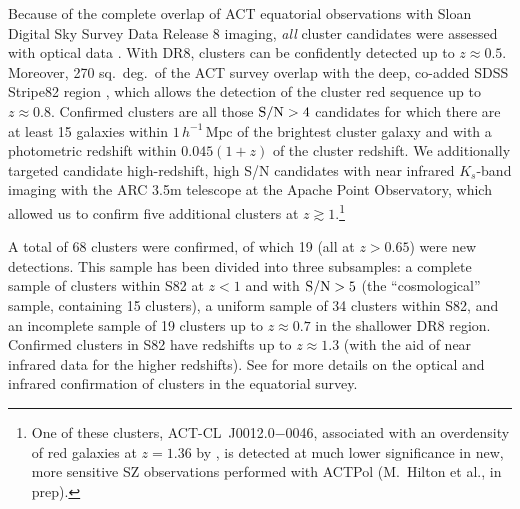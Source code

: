 Because of the complete overlap of ACT equatorial observations with Sloan Digital Sky Survey Data Release 8 \citep[SDSS DR8,][]{sdss8} imaging, {\em all} cluster candidates were assessed with optical data \citep{menanteau13}. With DR8, clusters can be confidently detected up to $z\approx0.5$. Moreover, 270 sq.\ deg.\ of the ACT survey overlap with the deep, co-added SDSS Stripe82 region \citep[S82,][]{annis14}, which allows the detection of the cluster red sequence up to $z\approx0.8$. Confirmed clusters are all those ${\rm S/N}>4$ candidates for which there are at least 15 galaxies within $1\,h^{-1}\,\mathrm{Mpc}$ of the brightest cluster galaxy and with a photometric redshift within $0.045(1+z)$ of the cluster redshift. We additionally targeted candidate high-redshift, high S/N candidates with near infrared $K_s$-band imaging with the ARC 3.5m telescope at the Apache Point Observatory, which allowed us to confirm five additional clusters at $z\gtrsim1$.\footnote{One of these clusters, ACT-CL~J0012.0$-$0046, associated with an overdensity of red galaxies at $z=1.36$ by \cite{menanteau13}, is detected at much lower significance in new, more sensitive SZ observations performed with ACTPol (M.\ Hilton et al., in prep).}

A total of 68 clusters were confirmed, of which 19 (all at $z>0.65$) were new detections. This sample has been divided into three subsamples: a complete sample of clusters within S82 at $z<1$ and with ${\rm S/N}>5$ (the ``cosmological'' sample, containing 15 clusters), a uniform sample of 34 clusters within S82, and an incomplete sample of 19 clusters up to $z\approx0.7$ in the shallower DR8 region. Confirmed clusters in S82 have redshifts up to $z\approx1.3$ (with the aid of near infrared data for the higher redshifts). See \cite{menanteau13} for more details on the optical and infrared confirmation of clusters in the equatorial survey.

